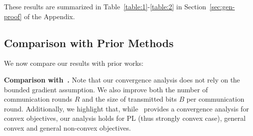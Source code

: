 \documentclass[twoside]{article}
\begin{document}

These results are summarized in Table~\ref{table:1}-\ref{table:2} in Section~\ref{sec:gen-proof} of the Appendix.

\vspace{-0.05in}
\subsection{Comparison with Prior Methods} 
\vspace{-0.1in}
We now compare our results with prior works:

\vspace{0.05in}\noindent\textbf{Comparison with~\cite{li2019privacy}.} Note that our convergence analysis does not rely on the bounded gradient assumption. We also improve both the number of communication rounds $R$ and the size of transmitted bits $B$ per communication round. 
Additionally, we highlight that, while~\cite{li2019privacy} provides a convergence analysis for convex objectives, our analysis holds for PL (thus strongly convex case), general convex and general non-convex objectives.
\end{document}
